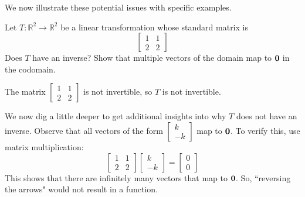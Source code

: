 \documentclass{ximera}
\renewcommand{\vec}[1]{{\bf #1}}
\newcommand{\RR}{\mathbb{R}}
\begin{document}
We now illustrate these potential issues with specific examples.
\begin{example}\label{ex:notonetoone} Let $T:\RR^2\rightarrow \RR^2$ be a linear transformation whose standard matrix is
$$\begin{bmatrix}1&1\\2&2\end{bmatrix}$$
Does $T$ have an inverse? Show that multiple vectors of the domain map to $\vec{0}$ in the codomain.  

\begin{explanation} The matrix $\begin{bmatrix}1&1\\2&2\end{bmatrix}$ is not invertible, so $T$ is not invertible.

We now dig a little deeper to get additional insights into why $T$ does not have an inverse.  Observe that all vectors of the form $\begin{bmatrix}k\\-k\end{bmatrix}$ map to $\vec{0}$.  To verify this, use matrix multiplication:
$$\begin{bmatrix}1&1\\2&2\end{bmatrix}\begin{bmatrix}k\\-k\end{bmatrix}=\begin{bmatrix}0\\0\end{bmatrix}$$
This shows that there are infinitely many vectors that map to $\vec{0}$.  So, ``reversing the arrows" would not result in a function.


\end{explanation}
\end{example}
\end{document}
